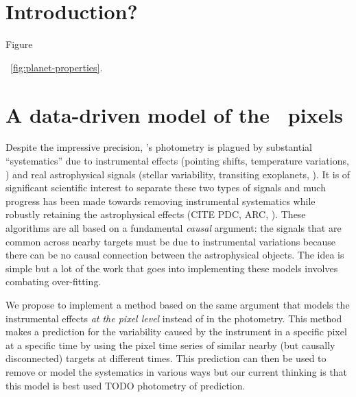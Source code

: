 \documentclass[letterpaper,12pt,preprint]{hack_aastex}
\begin{document}
\section{Introduction?}

Figure

\figurename~\ref{fig:planet-properties}.


\section{A data-driven model of the \Kepler\ pixels}

Despite the impressive precision, \Kepler's photometry is plagued by
substantial ``systematics'' due to instrumental effects (pointing shifts,
temperature variations, \etc) and real astrophysical signals (stellar
variability, transiting exoplanets, \etc).
It is of significant scientific interest to separate these two types of
signals and much progress has been made towards removing instrumental
systematics while robustly retaining the astrophysical effects (CITE PDC, ARC,
\etc).
These algorithms are all based on a fundamental \emph{causal} argument: the
signals that are common across nearby targets must be due to instrumental
variations because there can be no causal connection between the astrophysical
objects.
The idea is simple but a lot of the work that goes into implementing these
models involves combating over-fitting.

We propose to implement a method based on the same argument that models the
instrumental effects \emph{at the pixel level} instead of in the photometry.
This method makes a prediction for the variability caused by the instrument in
a specific pixel at a specific time by using the pixel time series of similar
nearby (but causally disconnected) targets at different times.
This prediction can then be used to remove or model the systematics in various
ways but our current thinking is that this model is best used TODO photometry
of prediction.
\end{document}
